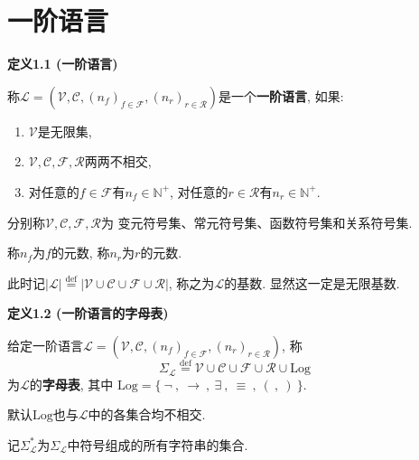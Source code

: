 


\setlength{\abovedisplayskip}{1pt}
\setlength{\belowdisplayskip}{1pt}

\section{一阶语言}

\hypertarget{sec:定义1.1}{}
\noindent\textbf{定义1.1 (一阶语言)}

称$\mathcal{L}=(\mathcal{V},\mathcal{C},
(n_f)_{f\in\mathcal{F}},(n_r)_{r\in\mathcal{R}})$是一个\textbf{一阶语言}, 如果:
\begin{enumerate}
    \item $\mathcal{V}$是无限集,
    \item $\mathcal{V},\mathcal{C},\mathcal{F},\mathcal{R}$两两不相交,
    \item 对任意的$f\in\mathcal{F}$有$n_f\in\mathbb{N}^+$,
    对任意的$r\in\mathcal{R}$有$n_r\in\mathbb{N}^+$.
\end{enumerate}

\vspace{10pt}

分别称$\mathcal{V},\mathcal{C},\mathcal{F},\mathcal{R}$为
变元符号集、常元符号集、函数符号集和关系符号集.

称$n_f$为$f$的元数, 称$n_r$为$r$的元数.

\vspace{10pt}

此时记$|\mathcal{L}|\overset{\mathrm{def}}{=}
|\mathcal{V}\cup\mathcal{C}\cup\mathcal{F}\cup\mathcal{R}|$,
称之为$\mathcal{L}$的基数. 显然这一定是无限基数.

\vspace{10pt}

\hypertarget{sec:定义1.2}{}
\noindent\textbf{定义1.2 (一阶语言的字母表)}

给定一阶语言$\mathcal{L}=(\mathcal{V},\mathcal{C},
(n_f)_{f\in\mathcal{F}},(n_r)_{r\in\mathcal{R}})$, 称
\[
    \Sigma_{\mathcal{L}}\overset{\mathrm{def}}{=}
    \mathcal{V}\cup\mathcal{C}\cup\mathcal{F}\cup\mathcal{R}\cup\mathrm{Log}
\]
为$\mathcal{L}$的\textbf{字母表}, 其中
$\mathrm{Log}=\{\ \neg\ ,\ \to\ ,\ \exists\ ,\ \equiv\ ,\ (\ ,\ )\ \}$.

默认$\mathrm{Log}$也与$\mathcal{L}$中的各集合均不相交.

\vspace{10pt}

记$\Sigma_{\mathcal{L}}^*$为$\Sigma_{\mathcal{L}}$中符号组成的所有字符串的集合.


